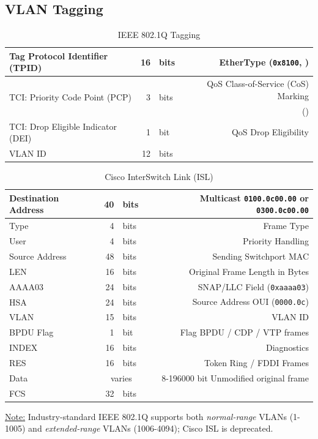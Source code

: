 \documentclass[12pt]{article}
\newif\ifcolor											%
\newcommand{\note}[1]{\ifcolor \colorbox{#1}{Note:}\else \underline{Note:}\fi}
\newcommand{\mc}[3]{\multicolumn{#1}{#2}{#3}}
\newcommand{\mr}[2]{\multirow{#1}{*}{#2}}
\begin{document}
	\subsection{VLAN Tagging \label{subsec:VLAN TAGGING}}
	\begin{table}[H]
	\centering
	\caption{IEEE 802.1Q Tagging \label{tab:802.1Q}}
	\begin{tabular}{| l | r @{ } l | r |}\hline
	Tag Protocol Identifier (TPID)			& 16		& bits		& EtherType (\texttt{0x8100}, \Cref{tab:ETHERTYPE})\\\hline
	\mr{2}{TCI: Priority Code Point (PCP)}	& \mr{2}{3}	& \mr{2}{bits}	& QoS Class-of-Service (CoS) Marking\\
								&		&			& (\Cref{sec:QOS})\\\hline
	TCI: Drop Eligible Indicator (DEI)		& 1		& bit 			& QoS Drop Eligibility\\\hline
	VLAN ID 						& 12		& bits		&\\\hline
	\end{tabular}\end{table}

	\begin{table}[H]
	\centering
	\caption{Cisco InterSwitch Link (ISL) \label{tab:CISCO ISL}}
	\begin{tabular}{| l | r @{ } l | r |}\hline
	Destination Address	& 40	& bits		& Multicast \texttt{0100.0c00.00} or \texttt{0300.0c00.00}\\\hline
	Type				& 4	& bits		& Frame Type\\\hline
	User				& 4	& bits		& Priority Handling\\\hline
	Source Address		& 48	& bits		& Sending Switchport MAC\\\hline
	LEN				& 16	& bits		& Original Frame Length in Bytes\\\hline
	AAAA03			& 24	& bits		& SNAP/LLC Field (\texttt{0xaaaa03})\\\hline
	HSA				& 24	& bits		& Source Address OUI (\texttt{0000.0c})\\\hline
	VLAN				& 15	& bits		& VLAN ID\\\hline
	BPDU Flag			& 1	& bit 			& Flag BPDU / CDP / VTP frames\\\hline
	INDEX			& 16	& bits		& Diagnostics\\\hline
	RES				& 16	& bits		& Token Ring / FDDI Frames\\\hline
	Data				& \mc{2}{c|}{varies}	& 8-196000 bit Unmodified original frame\\\hline
	FCS				& 32	& bits		&\\\hline
	\end{tabular}\end{table}
	\note{Goldenrod} Industry-standard IEEE 802.1Q supports both \textit{normal-range} VLANs (1-1005) and \textit{extended-range} VLANs (1006-4094); Cisco ISL is deprecated.
\end{document}
